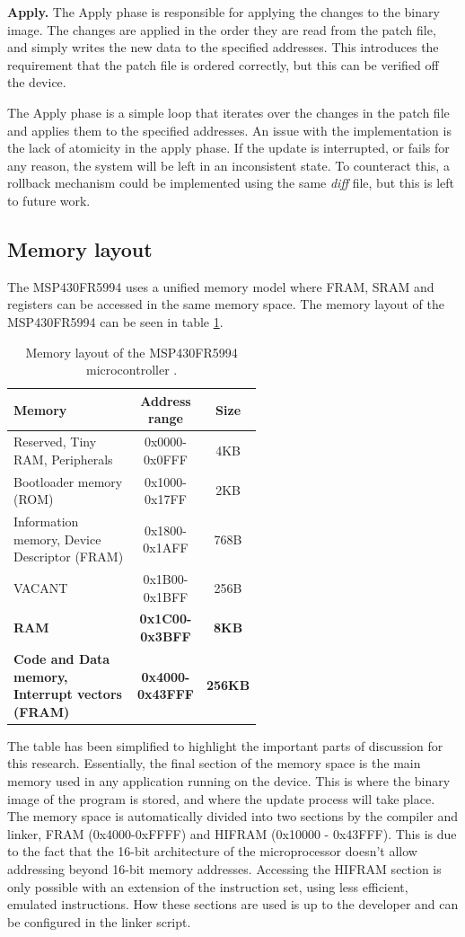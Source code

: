 \textbf{Apply.}
The Apply phase is responsible for applying the changes to the binary image. The changes are applied in the order they are read from the patch file, and simply writes the new data to the specified addresses. This introduces the requirement that the patch file is ordered correctly, but this can be verified off the device. 

The Apply phase is a simple loop that iterates over the changes in the patch file and applies them to the specified addresses. An issue with the implementation is the lack of atomicity in the apply phase. If the update is interrupted, or fails for any reason, the system will be left in an inconsistent state. To counteract this, a rollback mechanism could be implemented using the same \textit{diff} file, but this is left to future work.

\subsection{Memory layout}\label{sec:memory_layout}
The MSP430FR5994 uses a unified memory model where FRAM, SRAM and registers can be accessed in the same memory space. The memory layout of the MSP430FR5994 can be seen in table \ref{tab:memory_layout}.
\begin{table}[!ht]
\centering
\begin{tabular}{|p{0.55\linewidth}|c|c|}
    \hline
    \textbf{Memory} & \textbf{Address range} & \textbf{Size} \\
    \hline
    Reserved, Tiny RAM, Peripherals & 0x0000-0x0FFF & 4KB \\
    \hline
    Bootloader memory (ROM) & 0x1000-0x17FF & 2KB \\
    \hline
    Information memory, Device Descriptor (FRAM) & 0x1800-0x1AFF & 768B \\
    \hline
    VACANT & 0x1B00-0x1BFF & 256B \\
    \hline
    \textbf{RAM} & \textbf{0x1C00-0x3BFF} & \textbf{8KB} \\
    \hline
    \textbf{Code and Data memory, Interrupt vectors (FRAM)} & \textbf{0x4000-0x43FFF} & \textbf{256KB} \\
    \hline
\end{tabular}
\caption{Memory layout of the MSP430FR5994 microcontroller \cite{fr5994DataSheet}.}
\label{tab:memory_layout}
\end{table}

The table has been simplified to highlight the important parts of discussion for this research. Essentially, the final section of the memory space is the main memory used in any application running on the device. This is where the binary image of the program is stored, and where the update process will take place. The memory space is automatically divided into two sections by the compiler and linker, FRAM (0x4000-0xFFFF) and HIFRAM (0x10000 - 0x43FFF). This is due to the fact that the 16-bit architecture of the microprocessor doesn't allow addressing beyond 16-bit memory addresses. Accessing the HIFRAM section is only possible with an extension of the instruction set, using less efficient, emulated instructions. How these sections are used is up to the developer and can be configured in the linker script. 


